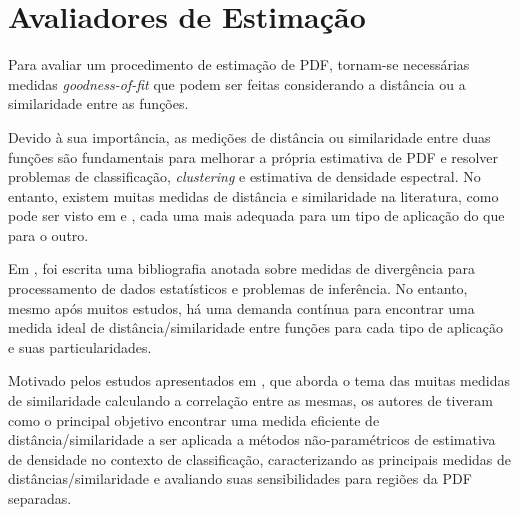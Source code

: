 \section{Avaliadores de Estimação}

Para avaliar um procedimento de estimação de \ac{PDF}, tornam-se necessárias medidas \textit{goodness-of-fit} que podem ser feitas considerando a distância ou a similaridade entre as funções.

Devido à sua importância, as medições de distância ou similaridade entre duas funções são fundamentais para melhorar a própria estimativa de \ac{PDF} e resolver problemas de classificação, \textit{clustering} e estimativa de densidade espectral. No entanto, existem muitas medidas de distância e similaridade na literatura, como pode ser visto em \cite{deza2006dictionary} e \cite{deza2009encyclopedia}, cada uma mais adequada para um tipo de aplicação do que para o outro.

Em \cite{basseville2013divergence}, foi escrita uma bibliografia anotada sobre medidas de divergência para processamento de dados estatísticos e problemas de inferência. No entanto, mesmo após muitos estudos, há uma demanda contínua para encontrar uma medida ideal de distância/similaridade entre funções para cada tipo de aplicação e suas particularidades.

Motivado pelos estudos apresentados em \cite{cha2007comprehensive}, que aborda o tema das muitas medidas de similaridade calculando a correlação entre as mesmas, os autores de \cite{souza2017study} tiveram como o principal objetivo encontrar uma medida eficiente de distância/similaridade a ser aplicada a métodos não-paramétricos de estimativa de densidade no contexto de classificação, caracterizando as principais medidas de distâncias/similaridade e avaliando suas sensibilidades para regiões da \ac{PDF} separadas.


